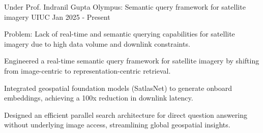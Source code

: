 \begin{cventries}


  \cventry
    {Under Prof. Indranil Gupta} %
    {Olympus: Semantic query framework for satellite imagery} %
    {UIUC} %
    {Jan 2025 - Present} %
    {
      \begin{cvitems} %
        \item Problem: Lack of real-time and semantic querying capabilities for satellite imagery due to high data volume and downlink constraints.
        \item Engineered a real-time semantic query framework for satellite imagery by shifting from image-centric to representation-centric retrieval.
        \item Integrated geospatial foundation models (SatlasNet) to generate onboard embeddings, achieving a 100x reduction in downlink latency.
        \item Designed an efficient parallel search architecture for direct question answering without underlying image access, streamlining global geospatial insights.
      \end{cvitems}
    }


%



\end{cventries}
